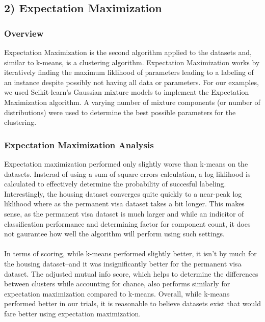 \documentclass[h]{article}
\begin{document}
\subsection*{2) Expectation Maximization}  
\subsubsection*{Overview}
Expectation Maximization is the second algorithm applied to the datasets and, 
similar to k-means, is a clustering algorithm.  Expectation Maximization works 
by iteratively finding the maximum liklihood of parameters leading to a labeling 
of an instance despite possibly not having all data or parameters.  For our 
examples, we used Scikit-learn's Gaussian mixture models to implement the 
Expectation Maximization algorithm.  A varying number of mixture components (or number of distributions) were 
used to determine the best possible parameters for the clustering.

\subsubsection*{Expectation Maximization Analysis}
Expectation maximization performed only slightly worse than k-means on the 
datasets.  Insterad of using a sum of square errors calculation, a log liklihood 
is calculated to effectively determine the probability of succesful labeling.  
Interestingly, the housing dataset converges quite quickly to a near-peak log 
liklihood where as the permanent visa dataset takes a bit longer.  This makes 
sense, as the permanent visa dataset is much larger and while an indicitor of 
classification performance and determining factor for component count, it does not gaurantee how well the 
algorithm will perform using such settings.
\\ \\
In terms of scoring, while k-means performed slightly better, it isn't by 
much for the housing dataset--and it was insignificantly better for the 
permanent visa dataset.  The adjusted mutual info score, which helps to 
determine the differences between clusters while accounting for chance, also 
performs similarly for expectation maximization compared to k-means.  Overall, 
while k-means performed better in our trials, it is reasonable to believe 
datasets exist that would fare better using expectation maximization.
\end{document}
